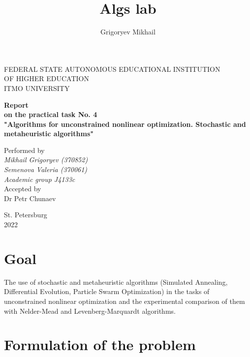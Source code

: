 \documentclass[12pt, a4paper]{article}
\author{Grigoryev Mikhail}
\title{Algs lab}
\begin{document}
\thispagestyle{empty}

\vspace{30mm}

\begin{center}
FEDERAL STATE AUTONOMOUS EDUCATIONAL INSTITUTION \\
OF HIGHER EDUCATION \\
ITMO UNIVERSITY

\vspace{40mm}

{\large \textbf{Report \\
on the practical task No. 4 \\
"Algorithms for unconstrained nonlinear optimization. Stochastic and metaheuristic algorithms"}}
\end{center}

\vspace{15mm}

\begin{flushright}
{\large Performed by \\
\textit{Mikhail Grigoryev (370852) \\
Semenova Valeria (370061) \\
Academic group J4133c \\}
Accepted by \\
Dr Petr Chunaev}
\end{flushright}

\vspace{80mm}

\begin{center}
St. Petersburg \\
2022
\end{center}

\newpage

\section*{Goal}

The use of stochastic and metaheuristic algorithms (Simulated Annealing, Differential Evolution, Particle Swarm Optimization) in the tasks of unconstrained nonlinear optimization and the experimental comparison of them with Nelder-Mead and Levenberg-Marquardt algorithms.

\section*{Formulation of the problem}
\end{document}
